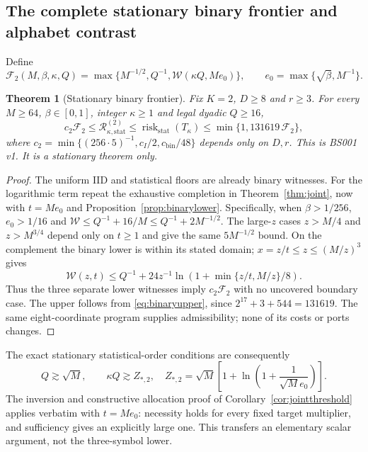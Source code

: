 \documentclass[11pt,letterpaper]{article}
\newtheorem{theorem}{Theorem}[section]
\theoremstyle{definition}\newtheorem{definition}[theorem]{Definition}
\theoremstyle{remark}\newtheorem{remark}[theorem]{Remark}
\newcommand{\Risk}{\mathcal{R}}
\newcommand{\unit}[1]{\textsf{#1}}
\begin{document}
\subsection{The complete stationary binary frontier and alphabet contrast}
Define
\[
 \mathcal F_2(M,\beta,\kappa,Q)
 =\max\{M^{-1/2},Q^{-1},\mathcal W(\kappa Q,Me_0)\},
 \qquad e_0=\max\{\sqrt\beta,M^{-1}\}.
\]
\begin{theorem}[Stationary binary frontier]\label{thm:binaryjoint}
Fix $K=2$, $D\ge8$ and $r\ge3$. For every $M\ge64$, $\beta\in[0,1]$, integer $\kappa\ge1$ and legal dyadic $Q\ge16$,
\begin{equation}\label{eq:binaryjoint}
 c_2\mathcal F_2\le\Risk_{\kappa,\mathrm{stat}}^{(2)}
 \le\operatorname{risk}_{\mathrm{stat}}(T_\kappa)
 \le\min\{1,131619\,\mathcal F_2\},
\end{equation}
where $c_2=\min\{(256\cdot5)^{-1},c_I/2,c_{\mathrm{bin}}/48\}$ depends only on $D,r$. This is \unit{BS001 v1}. It is a stationary theorem only.
\end{theorem}
\begin{proof}
The uniform IID and statistical floors are already binary witnesses. For the logarithmic term repeat the exhaustive completion in Theorem~\ref{thm:joint}, now with $t=Me_0$ and Proposition~\ref{prop:binarylower}. Specifically, when $\beta>1/256$, $e_0>1/16$ and
$\mathcal W\le Q^{-1}+16/M\le Q^{-1}+2M^{-1/2}$.
The large-$z$ cases $z>M/4$ and $z>M^{3/4}$ depend only on $t\ge1$ and give the same $5M^{-1/2}$ bound. On the complement the binary lower is within its stated domain; $x=z/t\le z\le(M/z)^3$ gives
\[
 \mathcal W(z,t)\le Q^{-1}
 +24z^{-1}\ln(1+\min\{z/t,M/z\}/8).
\]
Thus the three separate lower witnesses imply $c_2\mathcal F_2$ with no uncovered boundary case. The upper follows from \eqref{eq:binaryupper}, since
$2^{17}+3+544=131619$. The same eight-coordinate program supplies admissibility; none of its costs or ports changes.
\end{proof}

The exact stationary statistical-order conditions are consequently
\begin{equation}\label{eq:binarythreshold}
 Q\gtrsim\sqrt M,\qquad
 \kappa Q\gtrsim Z_{*,2},\quad
 Z_{*,2}=\sqrt M\left[1+\ln\left(1+\frac1{\sqrt M e_0}\right)\right].
\end{equation}
The inversion and constructive allocation proof of Corollary~\ref{cor:jointthreshold} applies verbatim with $t=Me_0$: necessity holds for every fixed target multiplier, and sufficiency gives an explicitly large one. This transfers an elementary scalar argument, not the three-symbol lower.
\end{document}

